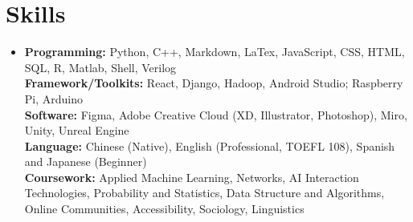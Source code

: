 \resumeSubHeadingListEnd
\vspace{-5mm}
\section{\textbf{Skills}}
\vspace{1mm}
 \begin{itemize}[leftmargin=0.05in, label={}]
\item \textbf{Programming: }{Python, C++, Markdown, LaTex, JavaScript, CSS, HTML, SQL, R, Matlab, Shell, Verilog} \\
\textbf{Framework/Toolkits: }{React, Django, Hadoop, Android Studio; Raspberry Pi, Arduino}\\
\textbf{Software: }Figma, Adobe Creative Cloud (XD, Illustrator, Photoshop), Miro, Unity, Unreal Engine\\
\textbf{Language: }Chinese (Native), English (Professional, TOEFL 108), Spanish and Japanese (Beginner)\\
\textbf{Coursework: } Applied Machine Learning, Networks, AI Interaction Technologies, Probability and Statistics, Data Structure and Algorithms, Online Communities, Accessibility, Sociology, Linguistics




    
 \end{itemize}
 \vspace{-16pt}
